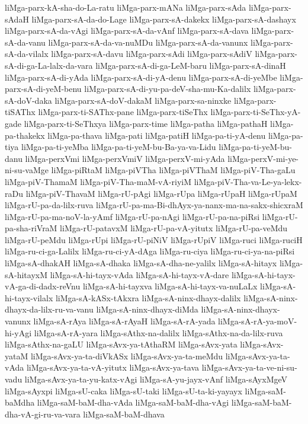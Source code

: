 {liMga-parx-kA-sha-do-La-ratu
liMga-parx-mANa
liMga-parx-sAda
liMga-parx-sAdaH
liMga-parx-sA-da-do-Lage
liMga-parx-sA-dakekx
liMga-parx-sA-dashayx
liMga-parx-sA-da-vAgi
liMga-parx-sA-da-vAnf
liMga-parx-sA-dava
liMga-parx-sA-da-vanu
liMga-parx-sA-da-va-nuMDu
liMga-parx-sA-da-vanunx
liMga-parx-sA-da-vilalx
liMga-parx-sA-davu
liMga-parx-sAdi
liMga-parx-sAdiV
liMga-parx-sA-di-ga-La-lalx-da-vara
liMga-parx-sA-di-ga-LeM-baru
liMga-parx-sA-dinaH
liMga-parx-sA-di-yAda
liMga-parx-sA-di-yA-denu
liMga-parx-sA-di-yeMbe
liMga-parx-sA-di-yeM-benu
liMga-parx-sA-di-yu-pa-deV-sha-mu-Ka-dalilx
liMga-parx-sA-doV-daka
liMga-parx-sA-doV-dakaM
liMga-parx-sa-ninxke
liMga-parx-tiSAThx
liMga-parx-ti-SAThx-pane
liMga-parx-tiSeThx
liMga-parx-ti-SeThx-yA-gade
liMga-parx-ti-SeThxya
liMga-parx-time
liMga-patha
liMga-pathaH
liMga-pa-thakekx
liMga-pa-thava
liMga-pati
liMga-patiH
liMga-pa-ti-yA-denu
liMga-pa-tiya
liMga-pa-ti-yeMba
liMga-pa-ti-yeM-bu-Ba-ya-va-Lidu
liMga-pa-ti-yeM-bu-danu
liMga-perxVmi
liMga-perxVmiV
liMga-perxV-mi-yAda
liMga-perxV-mi-ye-ni-su-vaMge
liMga-piRtaM
liMga-piVTha
liMga-piVThaM
liMga-piV-Tha-gaLu
liMga-piV-ThamaM
liMga-piV-Tha-maM-vA-riyiM
liMga-piV-Tha-va-Le-ya-lekx-raDu
liMga-piV-ThavaM
liMga-rU-pAgi
liMga-rUpa
liMga-rUpaH
liMga-rUpaM
liMga-rU-pa-da-lilx-ruva
liMga-rU-pa-ma-Bi-dhAyx-ya-nanx-ma-na-sakx-shicxraM
liMga-rU-pa-ma-noV-la-yAmf
liMga-rU-pa-nAgi
liMga-rU-pa-na-piRsi
liMga-rU-pa-sha-riVraM
liMga-rU-patavxM
liMga-rU-pa-vA-yitutx
liMga-rU-pa-veMdu
liMga-rU-peMdu
liMga-rUpi
liMga-rU-piNiV
liMga-rUpiV
liMga-ruci
liMga-ruciH
liMga-ru-ci-ga-Lalilx
liMga-ru-ci-yA-dAga
liMga-ru-ciya
liMga-ru-ci-ya-na-piRsi
liMga-sA-dhakAH
liMga-sA-dhaka
liMga-sA-dha-ne-yalilx
liMga-sA-hitayx
liMga-sA-hitayxM
liMga-sA-hi-tayx-vAda
liMga-sA-hi-tayx-vA-dare
liMga-sA-hi-tayx-vA-ga-di-dadx-reVnu
liMga-sA-hi-tayxva
liMga-sA-hi-tayx-va-nuLaLx
liMga-sA-hi-tayx-vilalx
liMga-sA-kASx-tAkxra
liMga-sA-ninx-dhayx-dalilx
liMga-sA-ninx-dhayx-da-lilx-ru-va-vanu
liMga-sA-ninx-dhayx-diMda
liMga-sA-ninx-dhayx-vanunx
liMga-sA-rAya
liMga-sA-rAyaH
liMga-sA-rA-yada
liMga-sA-rA-ya-moV-hi-yAgi
liMga-sA-rA-yara
liMga-sAthx-na-dalilx
liMga-sAthx-na-da-lilx-ruva
liMga-sAthx-na-gaLU
liMga-sAvx-ya-tAthaRM
liMga-sAvx-yata
liMga-sAvx-yataM
liMga-sAvx-ya-ta-diVkASx
liMga-sAvx-ya-ta-meMdu
liMga-sAvx-ya-ta-vAda
liMga-sAvx-ya-ta-vA-yitutx
liMga-sAvx-ya-tava
liMga-sAvx-ya-ta-ve-ni-su-vadu
liMga-sAvx-ya-ta-yu-katx-vAgi
liMga-sA-yu-jayx-vAnf
liMga-sAyxMgeV
liMga-sAyxpi
liMga-sU-caka
liMga-sU-taki
liMga-sU-ta-ki-yayayx
liMga-saM-baMdha
liMga-saM-baM-dha-vAda
liMga-saM-baM-dha-vAgi
liMga-saM-baM-dha-vA-gi-ru-va-vara
liMga-saM-baM-dhava
}
